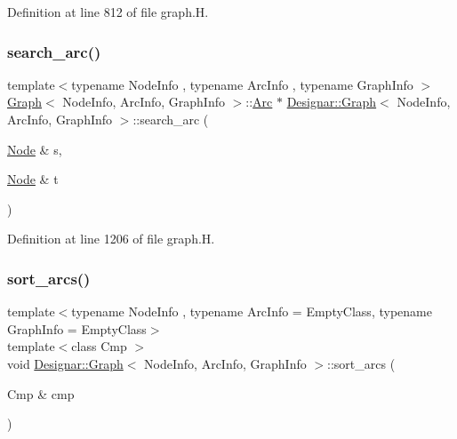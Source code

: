 Definition at line 812 of file graph.\+H.

\mbox{\label{class_designar_1_1_graph_afa69dd3cc6bacfed22864f5ad7c189ba}} 
\subsubsection{\texorpdfstring{search\+\_\+arc()}{search\_arc()}}
{\footnotesize\ttfamily template$<$typename Node\+Info , typename Arc\+Info , typename Graph\+Info $>$ \\
\hyperlink{class_designar_1_1_graph}{Graph}$<$ Node\+Info, Arc\+Info, Graph\+Info $>$\+::\hyperlink{class_designar_1_1_graph_a74c730ef4ce2d20f998d72bd25c2b5bf}{Arc} $\ast$ \hyperlink{class_designar_1_1_graph}{Designar\+::\+Graph}$<$ Node\+Info, Arc\+Info, Graph\+Info $>$\+::search\+\_\+arc (\begin{DoxyParamCaption}\item[{\hyperlink{class_designar_1_1_graph_a5dfc7dba9d092ac489c72e40390c37d0}{Node} \&}]{s,  }\item[{\hyperlink{class_designar_1_1_graph_a5dfc7dba9d092ac489c72e40390c37d0}{Node} \&}]{t }\end{DoxyParamCaption})}



Definition at line 1206 of file graph.\+H.

\mbox{\label{class_designar_1_1_graph_a39af536f6e08248e0d343dcd300713c2}} 
\subsubsection{\texorpdfstring{sort\+\_\+arcs()}{sort\_arcs()}\hspace{0.1cm}{\footnotesize\ttfamily [1/2]}}
{\footnotesize\ttfamily template$<$typename Node\+Info , typename Arc\+Info  = Empty\+Class, typename Graph\+Info  = Empty\+Class$>$ \\
template$<$class Cmp $>$ \\
void \hyperlink{class_designar_1_1_graph}{Designar\+::\+Graph}$<$ Node\+Info, Arc\+Info, Graph\+Info $>$\+::sort\+\_\+arcs (\begin{DoxyParamCaption}\item[{Cmp \&}]{cmp }\end{DoxyParamCaption})\hspace{0.3cm}{\ttfamily [inline]}}



